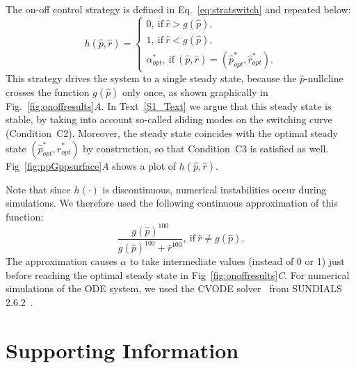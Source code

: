 \documentclass[10pt,letterpaper]{article}
\begin{document}
{The on-off control strategy is defined in Eq.~\ref{eq:stratswitch} and repeated below:
\begin{equation}
h(\hat{p}, \hat{r}) = 
\begin{cases}
0, \ \textrm{if} \ \hat{r} > g(\hat{p}),\\
1, \ \textrm{if} \ \hat{r} < g(\hat{p}), \\
\alpha_{opt}^*, \ \textrm{if} \ (\hat{p},\hat{r})=(\hat{p}_{opt}^*,\hat{r}_{opt}^*).
\end{cases}
\end{equation}
This strategy drives the system to a single steady state, because the $\hat{p}$-nullcline crosses the function $g(\hat{p})$ only once, as shown graphically in Fig.~\ref{fig:onoffresults}\textit{A}.
In Text~\ref{S1_Text} we argue that this steady state is stable, by taking into account so-called sliding modes on the switching curve~\cite{filippov_differential_1988} (Condition~C2).
Moreover, the steady state coincides with the optimal steady state $(\hat{p}_{opt}^*,\hat{r}_{opt}^*)$ by construction, so that Condition~C3 is satisfied as well.
Fig~\ref{fig:ppGppsurface}\textit{A} shows a plot of $h(\hat{p}, \hat{r})$.

Note that since $h(\cdot)$ is discontinuous, numerical instabilities occur during simulations.
We therefore used the following continuous approximation of this function:
\begin{equation}
\frac{g(\hat{p})^{100}}{g(\hat{p})^{100} + \hat{r}^{100}}, \ \textrm{if} \ \hat{r} \neq g(\hat{p}).
\end{equation}
The approximation causes $\alpha$ to take intermediate values (instead of 0 or 1) just before reaching the optimal steady state in Fig~\ref{fig:onoffresults}\textit{C}.
For numerical simulations of the ODE system, we used the CVODE solver~\cite{cohen_cvode_1996} from SUNDIALS 2.6.2~\cite{hindmarsh_sundials_2005}.

}

\section*{Supporting Information}

\makeatletter
\newcommand{\manuallabel}[2]{\def\@currentlabel{#2}\label{#1}}
\makeatother
\end{document}
